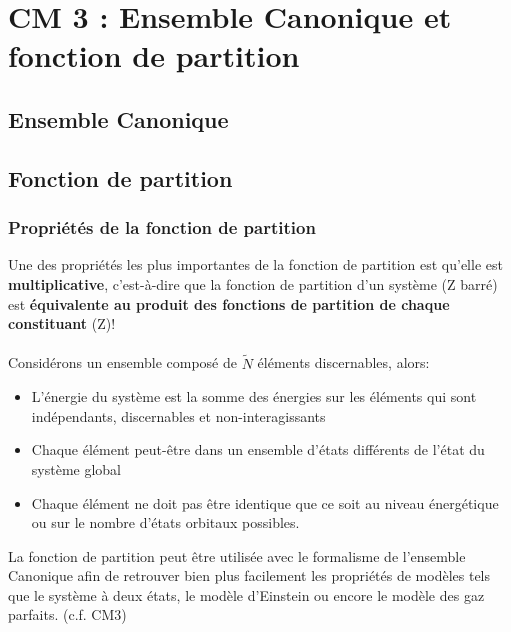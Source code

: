 \documentclass{article}
\newcommand{\insertslide}[3]{
\begin{center}
    \fbox{\texttt{[image: \#1]}}
\end{center}
}
\begin{document}
\section{CM 3 : Ensemble Canonique et fonction de partition}
    \subsection{Ensemble Canonique}
        \insertslide{Slides/CM3}{2}{.6}
    \subsection{Fonction de partition}
        \insertslide{Slides/CM3}{3}{.6}
        \insertslide{Slides/CM3}{4}{.6}
        \subsubsection{Propriétés de la fonction de partition}
            Une des propriétés les plus importantes de la fonction de partition est qu'elle est \textbf{multiplicative},
            c'est-à-dire que la fonction de partition d'un système (Z barré) est \textbf{équivalente au produit des fonctions de partition
            de chaque constituant} (Z)!\\\\
            Considérons un ensemble composé de $\tilde N$ éléments discernables, alors:
            \begin{itemize}
                \item L’énergie du système est la somme des énergies sur les éléments
                qui sont indépendants, discernables et non-interagissants
                \item Chaque élément peut-être dans un ensemble d’états différents de l'état du système global
                \item Chaque élément ne doit pas être identique que ce soit au niveau
                énergétique ou sur le nombre d’états orbitaux possibles.
            \end{itemize}
            La fonction de partition peut être utilisée avec le formalisme de l'ensemble Canonique
            afin de retrouver bien plus facilement les propriétés de modèles tels que le système à 
            deux états, le modèle d'Einstein ou encore le modèle des gaz parfaits. (c.f. CM3)
    
\end{document}
